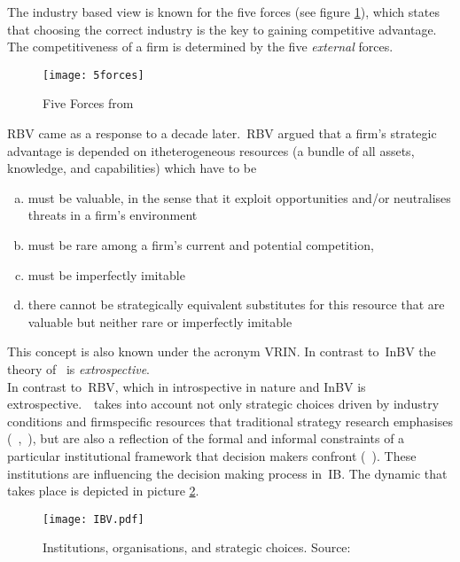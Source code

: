 The industry based view is known for the five forces (see figure \ref{fig:5forces}), which states that choosing the correct industry is the key to gaining competitive advantage. The competitiveness of a firm is determined by the five \emph{external} forces.

\begin{figure}[htbp] 
	\centering
	\texttt{[image: 5forces]}
 	\caption{Five Forces from \cite{Porter:1980}}
	\label{fig:5forces}
\end{figure}

\Gls{RBV} came as a response to \cite{Porter:1980} a decade later.~\Gls{RBV} argued that a firm's strategic advantage is depended on itheterogeneous resources (a bundle of all assets, knowledge, and capabilities) which have to be
\begin{enumerate}[(a)]
\item must be valuable, in the sense that it exploit opportunities and/or neutralises threats in a firm’s environment
\item must be rare among a firm’s current and potential competition, 
\item must be imperfectly imitable
\item  there cannot be strategically equivalent substitutes for this resource that are valuable but neither rare or imperfectly imitable 
\end{enumerate} 
This concept is also known under the acronym VRIN. In contrast to~\gls{InBV} the theory of~\cite{Barney:1991} is \emph{extrospective}. \\

In contrast to~\gls{RBV}, which in introspective in nature and \gls{InBV} is extrospective.~\ibv~takes into 
account not only strategic choices driven by industry conditions and firm\-specific resources that 
traditional strategy research emphasises (~\cite{Porter:1980},~\cite{Barney:1991}), but are also a 
reflection of the formal and informal constraints of a particular institutional framework that decision
makers confront (~\cite{Oliver:1997,Scott:1995}). These institutions are influencing the decision making process in~\gls{IB}.  The dynamic that takes place is depicted in picture \ref{fig:ibv}. 

\begin{figure}[htbp!] 
	\centering
	\texttt{[image: IBV.pdf]}
 	\caption{Institutions, organisations, and strategic choices. Source: \cite{Peng:2000}}
	\label{fig:ibv}
\end{figure}



